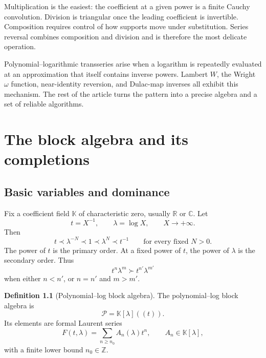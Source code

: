 \documentclass[11pt,openany]{book}
\theoremstyle{definition}
\newtheorem{definition}{Definition}[chapter]
\theoremstyle{plain}
\theoremstyle{remark}
\newcommand{\R}{\mathbb{R}}
\newcommand{\C}{\mathbb{C}}
\newcommand{\Z}{\mathbb{Z}}
\newcommand{\K}{\mathbb{K}}
\newcommand{\Plog}{\mathscr{P}}
\newcommand{\precdom}{\prec}
\newcommand{\succdom}{\succ}
\begin{document}
Multiplication is the easiest: the coefficient at a given power is a finite Cauchy convolution. Division is triangular once the leading coefficient is invertible. Composition requires control of how supports move under substitution. Series reversal combines composition and division and is therefore the most delicate operation.

\begin{summarybox}
Polynomial--logarithmic transseries arise when a logarithm is repeatedly evaluated at an approximation that itself contains inverse powers. Lambert \(W\), the Wright \(\omega\) function, near-identity reversion, and Dulac-map inverses all exhibit this mechanism. The rest of the article turns the pattern into a precise algebra and a set of reliable algorithms.
\end{summarybox}

\chapter{The block algebra and its completions}\label{ch:block-algebra}

\section{Basic variables and dominance}
Fix a coefficient field \(\K\) of characteristic zero, usually \(\R\) or \(\C\). Let
\begin{equation}\label{eq:t-lambda}
 t=X^{-1},\qquad \lambda=\log X,
 \qquad X\to+\infty.
\end{equation}
Then
\[
 t\precdom \lambda^{-N}\precdom1\precdom\lambda^N\precdom t^{-1}
 \qquad\text{for every fixed }N>0.
\]
The power of \(t\) is the primary order. At a fixed power of \(t\), the power of \(\lambda\) is the secondary order. Thus
\[
 t^n\lambda^m\succdom t^{n'}\lambda^{m'}
\]
when either \(n<n'\), or \(n=n'\) and \(m>m'\).

\begin{definition}[Polynomial--log block algebra]\label{def:Plog}
The polynomial--log block algebra is
\begin{equation}\label{eq:Plog}
 \Plog=\K[\lambda]((t)).
\end{equation}
Its elements are formal Laurent series
\begin{equation}\label{eq:block-form}
 F(t,\lambda)=\sum_{n\ge n_0} A_n(\lambda)t^n,
 \qquad A_n\in\K[\lambda],
\end{equation}
with a finite lower bound \(n_0\in\Z\).
\end{definition}
\end{document}
